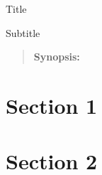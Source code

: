 


\begin{center}\begin{huge}
	Title
\end{huge}\end{center}

\begin{center}
    Subtitle
\end{center}

\begin{quotation}
	\noindent \textbf{Synopsis:} \lipsum[1]
\end{quotation}

\tableofcontents

\section{Section 1}

\lipsum[2-3]

\section{Section 2}

\lipsum[4-5]


